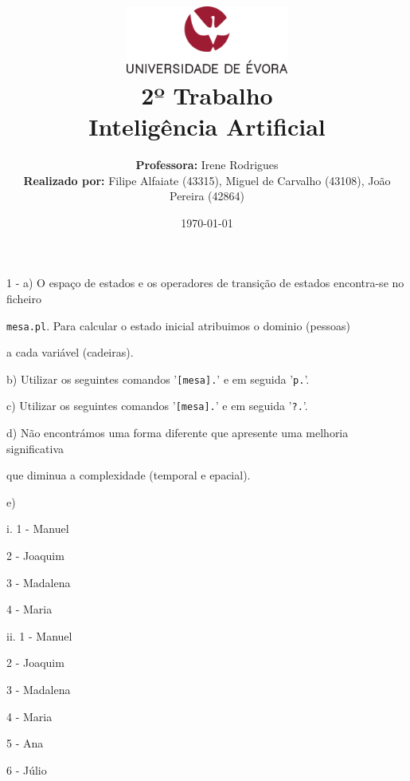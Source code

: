 \documentclass[11pt]{article}
\title
{
    \includegraphics[width=0.4\textwidth]{imgs/university.png}
    \\[0.1cm]
    \textbf{2º Trabalho} \\
    Inteligência Artificial
}
\author
{
    \textbf{Professora:} Irene Rodrigues \\
    \textbf{Realizado por:} Filipe Alfaiate (43315), Miguel de Carvalho (43108), João Pereira (42864) 
}
\date{\today}
\begin{document}
\maketitle

1 - a) O espaço de estados e os operadores de transição de estados encontra-se no ficheiro

\hspace{1,1cm}\verb|mesa.pl|. Para calcular o estado inicial atribuimos o dominio (pessoas)

\hspace{1,1cm}a cada variável (cadeiras).

\hspace{0,6cm}b) Utilizar os seguintes comandos '\verb|[mesa].|' e em seguida 
'\verb|p.|'.

\hspace{0,6cm}c) Utilizar os seguintes comandos '\verb|[mesa].|' e em seguida 
'\verb|?.|'.

\hspace{0,6cm}d) Não encontrámos uma forma diferente que apresente uma melhoria significativa

\hspace{1,1cm}que diminua a complexidade (temporal e epacial).

\hspace{0,6cm}e)

\hspace{1cm}i. 1 - Manuel

\hspace{1,4cm}2 - Joaquim

\hspace{1,4cm}3 - Madalena

\hspace{1,4cm}4 - Maria
\newline

\hspace{1cm}ii. 1 - Manuel

\hspace{1,5cm}2 - Joaquim

\hspace{1,5cm}3 - Madalena

\hspace{1,5cm}4 - Maria

\hspace{1,5cm}5 - Ana

\hspace{1,5cm}6 - Júlio
\newline
\end{document}
